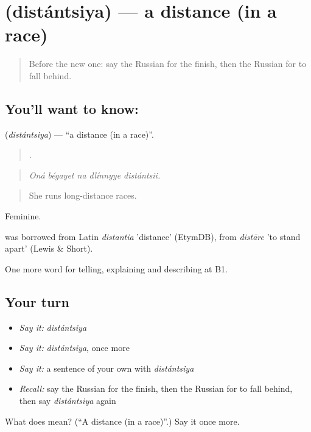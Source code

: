 \section[\texorpdfstring{\ru{дистанция} (distántsiya)}{дистанция (distántsiya)}]{ (distántsiya) — a distance (in a race)}

\label{lesson:RU-C512-distantsiya}



\begin{quote}
Before the new one: say the Russian for the finish, then the Russian for to fall behind.
\end{quote}

\subsection*{You'll want to know: }
\textbf{} (\emph{distántsiya}) — \textquotedblleft{}a distance (in a race)\textquotedblright{}.

\begin{quote}
    .
\end{quote}

\begin{quote}
\emph{Oná bégayet na dlínnyye distántsii.}
\end{quote}

\begin{quote}
She runs long-distance races.
\end{quote}

Feminine.

\begin{cousinweb}
\emph{} was borrowed from Latin \emph{distantia} 'distance' (EtymDB), from \emph{distāre} 'to stand apart' (Lewis \& Short).
\end{cousinweb}

\begin{grammarlens}[title={What you've built}]
One more word for telling, explaining and describing at B1.
\end{grammarlens}

\subsection*{Your turn}
\begin{itemize}
\raggedright
  \item \emph{Say it:} \emph{distántsiya}
  \item \emph{Say it:} \emph{distántsiya}, once more
  \item \emph{Say it:} a sentence of your own with \emph{distántsiya}
  \item \emph{Recall:} say the Russian for the finish, then the Russian for to fall behind, then say \emph{distántsiya} again
\end{itemize}

\begin{tcolorbox}[breakable,colback=teal!4,colframe=teal!35!black,title={Before you move on}]
What does  mean? (\textquotedblleft{}A distance (in a race)\textquotedblright{}.) Say it once more.
\end{tcolorbox}
